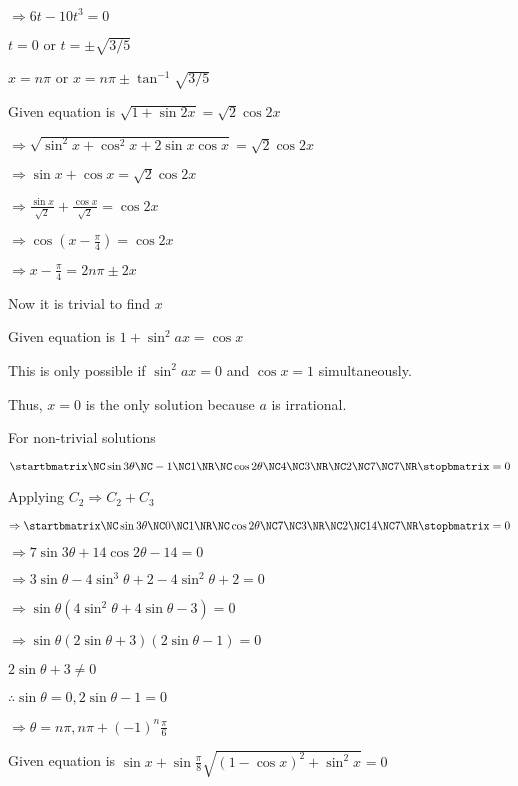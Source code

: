   $\Rightarrow 6t - 10t^3 = 0$

  $t = 0$ or $t = \pm\sqrt{3/5}$

  $x = n\pi$ or $x = n\pi \pm \tan^{-1}\sqrt{3/5}$

\item Given equation is $\sqrt{1 + \sin2x} = \sqrt{2}\cos2x$

  $\Rightarrow \sqrt{\sin^2x + \cos^2x + 2\sin x\cos x} = \sqrt{2}\cos2x$

  $\Rightarrow \sin x + \cos x = \sqrt{2}\cos2x$

  $\Rightarrow \frac{\sin x}{\sqrt{2}} + \frac{\cos x}{\sqrt{2}} = \cos2x$

  $\Rightarrow \cos\left(x - \frac{\pi}{4}\right) = \cos 2x$

  $\Rightarrow x - \frac{\pi}{4} = 2n\pi \pm 2x$

  Now it is trivial to find $x$

\item Given equation is $1 + \sin^2ax = \cos x$

  This is only possible if $\sin^2ax = 0$ and $\cos x = 1$ simultaneously.

  Thus, $x = 0$ is the only solution because $a$ is irrational.

\item For non-trivial solutions

  $\startbmatrix\NC\sin3\theta \NC -1 \NC 1\NR\NC\cos2\theta \NC 4 \NC 3\NR\NC2 \NC 7 \NC 7\NR\stopbmatrix = 0$

  Applying $C_2\Rightarrow C_2 + C_3$

  $\Rightarrow \startbmatrix\NC\sin3\theta \NC 0 \NC 1\NR\NC\cos2\theta \NC 7 \NC 3\NR\NC2 \NC 14 \NC 7\NR\stopbmatrix = 0$

  $\Rightarrow 7\sin3\theta + 14\cos2\theta - 14 = 0$

  $\Rightarrow 3\sin\theta - 4\sin^3\theta + 2 - 4\sin^2\theta + 2 = 0$

  $\Rightarrow \sin\theta(4\sin^2\theta + 4\sin\theta - 3) = 0$

  $\Rightarrow \sin\theta(2\sin\theta + 3)(2\sin\theta - 1) = 0$

  $2\sin\theta + 3 \neq 0$

  $\therefore \sin\theta = 0, 2\sin\theta - 1 = 0$

  $\Rightarrow \theta = n\pi, n\pi + (-1)^n\frac{\pi}{6}$

\item Given equation is $\sin x + \sin\frac{\pi}{8}\sqrt{(1 - \cos x)^2 + \sin^2x} = 0$

